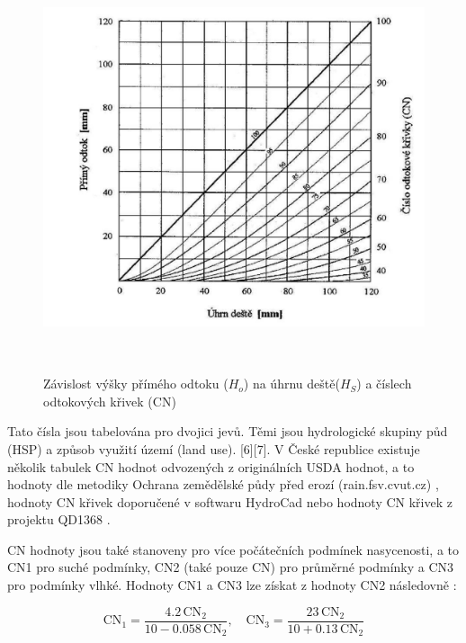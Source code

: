 \documentclass[a4paper,oneside,12pt]{book}
\begin{document}
\begin{figure}[ht] \label{obr1}
\centering
\includegraphics[height=12cm]{pictures/CNcurves.jpg}
\caption{ Závislost výšky přímého odtoku ($H_{o}$) na úhrnu deště($H_{S}$) a číslech odtokových křivek (CN) \cite{MNYDGwleJOjKdRUp}}
\label{fig:example}
\end{figure}

 \hspace{10mm} Tato čísla jsou tabelována pro dvojici jevů. Těmi jsou hydrologické skupiny půd (HSP) a způsob využití území (land use). [6][7]. V České republice existuje několik tabulek CN hodnot odvozených z originálních USDA hodnot, a to hodnoty dle metodiky Ochrana zemědělské půdy před erozí (rain.fsv.cvut.cz) \cite{MNYDGwleJOjKdRUp}, hodnoty CN křivek doporučené v softwaru HydroCad nebo hodnoty CN křivek z projektu QD1368 \cite{Kulasova2004}.

 \hspace{10mm} CN hodnoty jsou také stanoveny pro více počátečních podmínek nasycenosti, a to CN1 pro suché podmínky, CN2 (také pouze CN) pro průměrné podmínky a CN3 pro podmínky vlhké. \cite{dile2016} Hodnoty CN1 a CN3 lze získat z hodnoty CN2 následovně \cite{Batvari2021}:
 
\begin{equation}
\text{CN}_{1} = \frac{4.2 \, \text{CN}_{2}}{10 - 0.058 \, \text{CN}_{2}}, \quad
\text{CN}_{3} = \frac{23 \, \text{CN}_{2}}{10 + 0.13 \, \text{CN}_{2}}
\end{equation}
\end{document}
